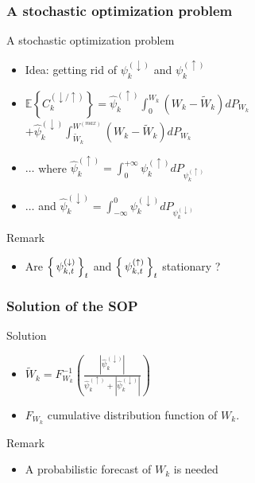 \begin{frame}\frametitle{A stochastic optimization problem}
  \begin{block}{A stochastic optimization problem}

  \begin{itemize}
    \item Idea:  getting rid of $\psi _ { k } ^ { ( \downarrow ) }$ and $\psi _ { k } ^ { ( \uparrow ) }$
    \item $\mathbb { E } \left\{ C _ { k } ^ { ( \downarrow / \uparrow ) } \right\} = \widehat { \psi } _ { k } ^ { ( \uparrow ) } \int _ { 0 } ^ { W _ { k } } \left( W _ { k } - \widetilde { W } _ { k } \right) d P _ { W _ { k } }$
    $+\widehat { \psi } _ { k } ^ { ( \downarrow ) } \int _ { \widetilde { W } _ { k } } ^ { W ^ { ( m a x ) } } \left( W _ { k } - \widetilde { W } _ { k } \right) d P _ { W _ { k } }$
    \item $\ldots$ where $\widehat { \psi } _ { k } ^ { ( \uparrow ) }= \int _ { 0 } ^ { + \infty } \psi _ { k } ^ { ( \uparrow ) } d P _ { \psi _ { k } ^ { ( \uparrow ) } }$
    \item $\ldots$ and $\widehat { \psi } _ { k } ^ { ( \downarrow ) } = \int _ { - \infty } ^ { 0 } \psi _ { k } ^ { ( \downarrow ) } d P _ { \psi _ { k } ^ { ( \downarrow ) } }$
  \end{itemize}
\end{block}

\begin{block}{Remark}
  \begin{itemize}
    \item Are $\left \{ \, \psi _ { k,t } ^ { ( \downarrow ) } \, \right \}_t$ and
    $\left \{ \, \psi _ { k,t } ^ { ( \uparrow ) } \, \right \}_t$ stationary ?
  \end{itemize}
\end{block}
\end{frame}


\begin{frame}\frametitle{Solution of the SOP}
\begin{block}{Solution}
  \begin{itemize}
    \item $\widetilde { W } _ { k } = F _ { W _ { k } } ^ { - 1 } \left( \frac { \left| \widehat { \psi } _ { k } ^ { ( \downarrow ) } \right| } { \widehat { \psi } _ { k } ^ { ( \uparrow ) } + \left| \widehat { \psi } _ { k } ^ { ( \downarrow ) } \right| } \right)$
    \item $F _ { W _ { k } }$ cumulative distribution function of $W _ { k }$.
  \end{itemize}

  \begin{block}{Remark}
    \begin{itemize}
      \item A probabilistic forecast of $W_k$ is needed
    \end{itemize}
  \end{block}
\end{block}
\end{frame}


